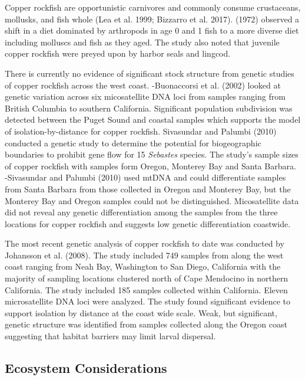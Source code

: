 \documentclass[11pt,
  english,
  letterpaper,
]{article}
\begin{document}
Copper rockfish are opportunistic carnivores and commonly consume crustaceans, mollusks, and fish whole (Lea et al. 1999; Bizzarro et al. 2017). (1972) observed a shift in a diet dominated by arthropods in age 0 and 1 fish to a more diverse diet including molluscs and fish as they aged. The study also noted that juvenile copper rockfish were preyed upon by harbor seals and lingcod.

There is currently no evidence of significant stock structure from genetic studies of copper rockfish across the west coast. -Buonaccorsi et al. (2002) looked at genetic variation across six micosatellite DNA loci from samples ranging from British Columbia to southern California. Significant population subdivision was detected between the Puget Sound and coastal samples which supports the model of isolation-by-distance for copper rockfish. Sivasundar and Palumbi (2010) conducted a genetic study to determine the potential for biogeographic boundaries to prohibit gene flow for 15 \emph{Sebastes} species. The study's sample sizes of copper rockfish with samples form Oregon, Monterey Bay and Santa Barbara. -Sivasundar and Palumbi (2010) used mtDNA and could differentiate samples from Santa Barbara from those collected in Oregon and Monterey Bay, but the Monterey Bay and Oregon samples could not be distinguished. Micosatellite data did not reveal any genetic differentiation among the samples from the three locations for copper rockfish and suggests low genetic differentiation coastwide.

The most recent genetic analysis of copper rockfish to date was conducted by Johansson et al. (2008). The study included 749 samples from along the west coast ranging from Neah Bay, Washington to San Diego, California with the majority of sampling locations clustered north of Cape Mendocino in northern California. The study included 185 samples collected within California. Eleven microsatellite DNA loci were analyzed. The study found significant evidence to support isolation by distance at the coast wide scale. Weak, but significant, genetic structure was identified from samples collected along the Oregon coast suggesting that habitat barriers may limit larval dispersal.

\hypertarget{ecosystem-considerations-1}{%
\subsection{Ecosystem Considerations}\label{ecosystem-considerations-1}}
\end{document}

